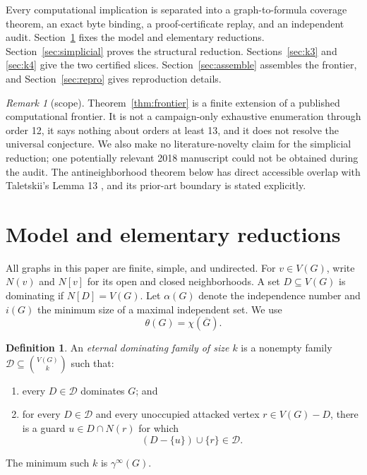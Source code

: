 \documentclass[11pt]{article}
\theoremstyle{definition}
\newtheorem{definition}[theorem]{Definition}
\theoremstyle{remark}
\newtheorem{remark}[theorem]{Remark}
\newcommand{\gaminf}{\gamma^{\infty}}
\newcommand{\V}{V}
\begin{document}
Every computational implication is separated into a graph-to-formula
coverage theorem, an exact byte binding, a proof-certificate replay, and an
independent audit.  Section~\ref{sec:basic} fixes the model and elementary
reductions.  Section~\ref{sec:simplicial} proves the structural reduction.
Sections~\ref{sec:k3} and \ref{sec:k4} give the two certified slices.
Section~\ref{sec:assemble} assembles the frontier, and
Section~\ref{sec:repro} gives reproduction details.

\begin{remark}[scope]\label{rem:scope-intro}
Theorem~\ref{thm:frontier} is a finite extension of a published
computational frontier.  It is not a campaign-only exhaustive enumeration
through order 12, it says nothing about orders at least 13, and it does not
resolve the universal conjecture.  We also make no literature-novelty claim
for the simplicial reduction; one potentially relevant 2018 manuscript
could not be obtained during the audit.  The antineighborhood theorem below
has direct accessible overlap with Taletskii's Lemma 13
\cite{Taletskii2024}, and its prior-art boundary is stated explicitly.
\end{remark}

\section{Model and elementary reductions}\label{sec:basic}

All graphs in this paper are finite, simple, and undirected.  For
\(v\in\V(G)\), write \(N(v)\) and \(N[v]\) for its open and closed
neighborhoods.  A set \(D\subseteq\V(G)\) is dominating if
\(N[D]=\V(G)\).  Let \(\alpha(G)\) denote the independence number and
\(i(G)\) the minimum size of a maximal independent set.  We use
\[
  \theta(G)=\chi(\overline G).
\tag{2.1}
\]

\begin{definition}\label{def:eternal}
An \emph{eternal dominating family of size \(k\)} is a nonempty family
\(\mathcal D\subseteq\binom{\V(G)}k\) such that:
\begin{enumerate}
\item every \(D\in\mathcal D\) dominates \(G\); and
\item for every \(D\in\mathcal D\) and every unoccupied attacked vertex
      \(r\in\V(G)-D\), there is a guard \(u\in D\cap N(r)\) for which
      \[
        (D-\{u\})\cup\{r\}\in\mathcal D.
      \tag{2.2}
      \]
\end{enumerate}
The minimum such \(k\) is \(\gaminf(G)\).
\end{definition}
\end{document}
